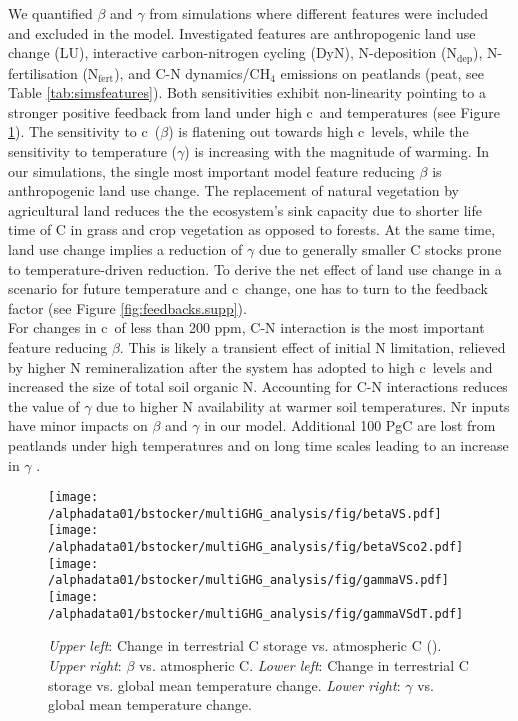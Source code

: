 We quantified $\beta$ and $\gamma$ from simulations where different features were included and excluded in the model. Investigated features are anthropogenic land use change (LU), interactive carbon-nitrogen cycling (DyN), N-deposition (N$_{\mathrm{dep}}$), N-fertilisation (N$_{\mathrm{fert}}$), and C-N dynamics/CH$_4$ emissions on peatlands (peat, see Table \ref{tab:simsfeatures}). Both sensitivities exhibit non-linearity pointing to a stronger positive feedback from land under high c\coo\ and temperatures (see Figure \ref{fig:betagamma}). The sensitivity to c\coo\ ($\beta$) is flatening out towards high c\coo\ levels, while the sensitivity to temperature ($\gamma$) is increasing with the magnitude of warming. In our simulations, the single most important model feature reducing $\beta$ is anthropogenic land use change. The replacement of natural vegetation by agricultural land reduces the the ecosystem's sink capacity due to shorter life time of C in grass and crop vegetation as opposed to forests. At the same time, land use change implies a reduction of $\gamma$ due to generally smaller C stocks prone to temperature-driven reduction. To derive the net effect of land use change in a scenario for future temperature and c\coo\ change, one has to turn to the feedback factor (see Figure \ref{fig:feedbacks.supp}).\\

For changes in c\coo\ of less than 200 ppm, C-N interaction is the most important feature reducing $\beta$. This is likely a transient effect of initial N limitation, relieved by higher N remineralization after the system has adopted to high c\coo\ levels and increased the size of total soil organic N. Accounting for C-N interactions reduces the value of $\gamma$ due to higher N availability at warmer soil temperatures. Nr inputs have minor impacts on $\beta$ and $\gamma$ in our model. Additional 100 PgC are lost from peatlands under high temperatures and on long time scales leading to an increase in $\gamma$ .
\begin{figure}[ht!]
\begin{center}
\texttt{[image: /alphadata01/bstocker/multiGHG\_analysis/fig/betaVS.pdf]}
\texttt{[image: /alphadata01/bstocker/multiGHG\_analysis/fig/betaVSco2.pdf]}\\
\texttt{[image: /alphadata01/bstocker/multiGHG\_analysis/fig/gammaVS.pdf]}
\texttt{[image: /alphadata01/bstocker/multiGHG\_analysis/fig/gammaVSdT.pdf]}
\end{center}
\caption[Carbon cycle sensitivities to \coo\ ($\beta$) and climate ($\gamma$) for model setups excluding different features]{{\sl Upper left}: Change in terrestrial C storage vs. atmospheric C (\coo). {\sl Upper right}: $\beta$ vs. atmospheric C. {\sl Lower left}: Change in terrestrial C storage vs. global mean temperature change. {\sl Lower right}: $\gamma$ vs. global mean temperature change.}
\label{fig:betagamma}
\end{figure}


